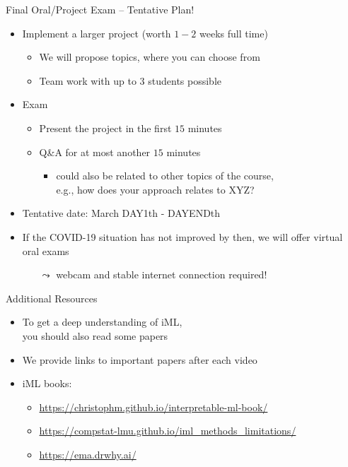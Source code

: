 \documentclass[aspectratio=169]{../latex_main/tntbeamer}  %
\begin{document}
\begin{frame}[c]{Final Oral/Project Exam -- Tentative Plan!}

\begin{itemize}
  \item Implement a larger project (worth $1-2$ weeks full time)
  \begin{itemize}
 		\item We will propose topics, where you can choose from
 		\item Team work with up to $3$ students possible
  \end{itemize}
  \pause
  \item Exam
	\begin{itemize}
		\item Present the project in the first $15$ minutes
		\item Q\&A for at most another $15$ minutes
		    \begin{itemize}
		        \item could also be related to other topics of the course, \\
		        e.g., how does your approach relates to XYZ?
		    \end{itemize}
	\end{itemize}	
  \item Tentative date: March DAY1th - DAYENDth
  \pause
  \item If the COVID-19 situation has not improved by then, we will offer virtual oral exams 
  \begin{itemize}
      \item[$\leadsto$] webcam and stable internet connection required!
  \end{itemize}
\end{itemize}

\end{frame}
\begin{frame}[c]{Additional Resources}

\begin{itemize}
  \item To get a deep understanding of iML,\\ you should also read some papers 
  \item We provide links to important papers after each video
  \item iML books: 
  \begin{itemize}
      \item \url{https://christophm.github.io/interpretable-ml-book/}
      \item \url{https://compstat-lmu.github.io/iml_methods_limitations/}
      \item \url{https://ema.drwhy.ai/}
  \end{itemize}
\end{itemize}

\end{frame}
\end{document}
